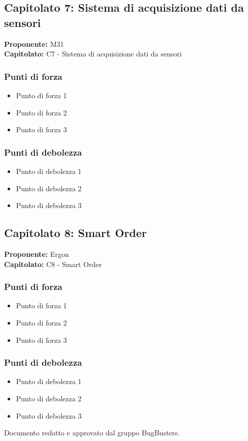 \documentclass[a4paper,12pt]{article}
\begin{document}
\subsection{Capitolato 7: Sistema di acquisizione dati da sensori}

\begin{tcolorbox}[colback=lightgray!30,colframe=darkgray,arc=2mm,boxrule=0.3pt]
\textbf{Proponente:} M31 \\
\textbf{Capitolato:} C7 - Sistema di acquisizione dati da sensori
\end{tcolorbox}

\subsubsection{Punti di forza}
\begin{itemize}
\item Punto di forza 1
\item Punto di forza 2
\item Punto di forza 3
\end{itemize}

\subsubsection{Punti di debolezza}
\begin{itemize}
\item Punto di debolezza 1
\item Punto di debolezza 2
\item Punto di debolezza 3
\end{itemize}

\subsection{Capitolato 8: Smart Order}

\begin{tcolorbox}[colback=lightgray!30,colframe=darkgray,arc=2mm,boxrule=0.3pt]
\textbf{Proponente:} Ergon \\
\textbf{Capitolato:} C8 - Smart Order
\end{tcolorbox}

\subsubsection{Punti di forza}
\begin{itemize}
\item Punto di forza 1
\item Punto di forza 2
\item Punto di forza 3
\end{itemize}

\subsubsection{Punti di debolezza}
\begin{itemize}
\item Punto di debolezza 1
\item Punto di debolezza 2
\item Punto di debolezza 3
\end{itemize}

\vfill
\begin{center}
    {\small\color{darkgray} Documento redatto e approvato dal gruppo BugBusters.}
\end{center}
\end{document}
